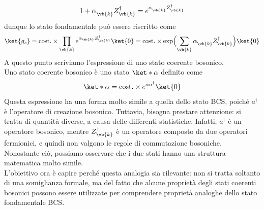 \begin{equation*}
   1 + \alpha^{\vphantom{\dag}}_{\vb{k}} Z^\dagger_{\vb{k}}
   =e^{\alpha^{\vphantom{\dag}}_{\vb{k}} Z^\dagger_{\vb{k}}}
\end{equation*}
dunque lo stato fondamentale può essere riscritto come
\begin{equation}
   \ket{g_s}
   =\text{cost.} \times \prod_{\vb{k}} e^{\alpha_{\vb{k}} Z^\dagger_{\vb{k}}} \ket{0}
   =\text{cost.} \times \exp \Bigl( \sum_{\vb{k}} \alpha^{\vphantom{\dag}}_{\vb{k}} Z^\dagger_{\vb{k}} \Bigr) \ket{0}
   \label{eq:BCS_ground_state_forma_stato_coerente}
\end{equation}
A questo punto scriviamo l'espressione di uno stato coerente bosonico.\\
Uno stato coerente bosonico è uno stato $\ket*{\alpha}$ definito come
\begin{equation*}
   \ket*{\alpha}
   =\text{cost.} \times e^{\alpha a^{\dag}} \ket{0}
\end{equation*}
Questa espressione ha una forma molto simile a quella dello stato BCS, poiché $a^{\dag}$ è l'operatore di creazione bosonico. Tuttavia, bisogna prestare attenzione: si tratta di quantità diverse, a causa delle differenti statistiche. Infatti, $a^{\dag}$ è un operatore bosonico, mentre $Z^{\dag}_{\vb{k}}$ è un operatore composto da due operatori fermionici, e quindi non valgono le regole di commutazione bosoniche.\\
Nonostante ciò, possiamo osservare che i due stati hanno una struttura matematica molto simile.\\
L'obiettivo ora è capire perché questa analogia sia rilevante: non si tratta soltanto di una somiglianza formale, ma del fatto che alcune proprietà degli stati coerenti bosonici possono essere utilizzate per comprendere proprietà analoghe dello stato fondamentale BCS.
